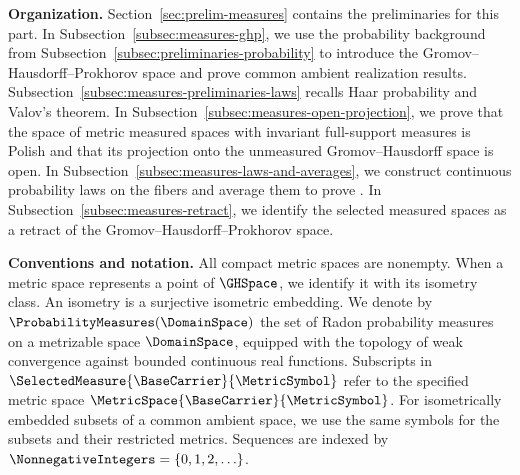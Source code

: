 \medskip
\noindent\textbf{Organization.}
Section~\ref{sec:prelim-measures} contains the preliminaries for this part.
In Subsection~\ref{subsec:measures-ghp},
we use the probability background from Subsection~\ref{subsec:preliminaries-probability}
to introduce the Gromov--Hausdorff--Prokhorov space and prove common ambient
realization results.
Subsection~\ref{subsec:measures-preliminaries-laws} recalls Haar probability
and Valov's theorem.
In Subsection~\ref{subsec:measures-open-projection},
we prove that the space of metric measured spaces with invariant full-support
measures is Polish
and that its projection onto the unmeasured Gromov--Hausdorff space is open.
In Subsection~\ref{subsec:measures-laws-and-averages},
we construct continuous probability laws on the fibers
and average them to prove .
In Subsection~\ref{subsec:measures-retract},
we identify the selected measured spaces as a retract
of the Gromov--Hausdorff--Prokhorov space.

\medskip
\noindent\textbf{Conventions and notation.}
All compact metric spaces are nonempty.
When a metric space represents a point of
$\GHSpace$,
we identify it with its isometry class.
An isometry is a surjective isometric embedding.
We denote by
$\ProbabilityMeasures(\DomainSpace)$
the set of Radon probability measures on a metrizable space
$\DomainSpace$,
equipped with the topology of weak convergence against bounded continuous real functions.
Subscripts in
$\SelectedMeasure{\BaseCarrier}{\MetricSymbol}$
refer to the specified metric space
$\MetricSpace{\BaseCarrier}{\MetricSymbol}$.
For isometrically embedded subsets of a common ambient space,
we use the same symbols for the subsets and their restricted metrics.
Sequences are indexed by
$\NonnegativeIntegers=\{0,1,2,\ldots\}$.
